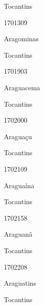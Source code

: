 \documentclass[
  letterpaper,
]{report}
\begin{document}
\n    

\n    

\n      

Tocantins

\n      

1701309

\n      

Aragominas

\n    

\n    

\n      

Tocantins

\n      

1701903

\n      

Araguacema

\n    

\n    

\n      

Tocantins

\n      

1702000

\n      

Araguaçu

\n    

\n    

\n      

Tocantins

\n      

1702109

\n      

Araguaína

\n    

\n    

\n      

Tocantins

\n      

1702158

\n      

Araguanã

\n    

\n    

\n      

Tocantins

\n      

1702208

\n      

Araguatins

\n    

\n    

\n      

Tocantins

\n      
\end{document}
